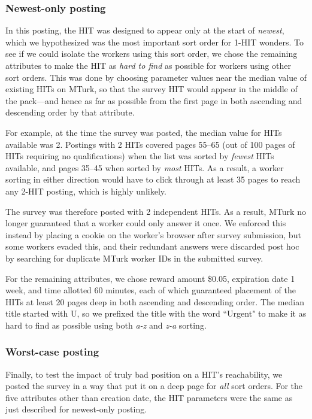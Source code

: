 \documentclass{acm_proc_article-sp}
\begin{document}

\subsubsection{Newest-only posting}
In this posting, the HIT was designed to appear only at the start of
{\em newest}, which we hypothesized was the most important sort order
for 1-HIT wonders.  To see if we could isolate the workers using this
sort order, we chose the remaining attributes to make the HIT as {\em
  hard to find} as possible for workers using other sort orders.  This
was done by choosing parameter values near the median value of
existing HITs on MTurk, so that the survey HIT would appear in the
middle of the pack---and hence as far as possible from the first page
in both ascending and descending order by that attribute.

For example, at the time the survey was posted, the median value for
HITs available was 2.  Postings with 2 HITs covered pages 55--65 (out
of 100 pages of HITs requiring no qualifications) when the list was
sorted by {\em fewest} HITs available, and pages 35--45 when sorted by
{\em most} HITs.  As a result, a worker sorting in either direction
would have to click through at least 35 pages to reach any 2-HIT
posting, which is highly unlikely.

The survey was therefore posted with 2 independent HITs.  As a result,
MTurk no longer guaranteed that a worker could only answer it once.
We enforced this instead by placing a cookie on the worker's browser
after survey submission, but some workers evaded this, and their
redundant answers were discarded post hoc by searching for duplicate
MTurk worker IDs in the submitted survey.

For the remaining attributes, we chose reward amount \$0.05,
expiration date 1 week, and time allotted 60 minutes, each of which
guaranteed placement of the HITs at least 20 pages deep in both
ascending and descending order.  The median title started with U, so
we prefixed the title with the word ``Urgent" to make it as hard to
find as possible using both {\em a-z} and {\em z-a} sorting.

\subsubsection{Worst-case  posting}
Finally, to test the impact of truly bad position on a HIT's
reachability, we posted the survey in a way that put it on a deep page
for {\em all} sort orders.  For the five attributes other than
creation date, the HIT parameters were the same as just described for
newest-only posting.
\end{document}
